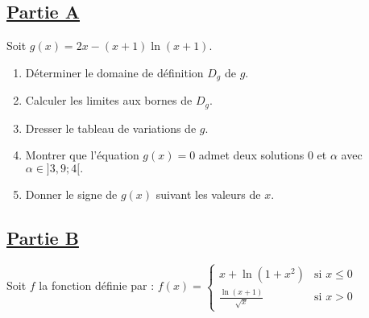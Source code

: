 \documentclass[12pt,a4paper]{article}
\begin{document}
    \section*{}

    \subsection*{\underline{\textbf{Partie A}}}

    Soit  \( g(x) = 2x - (x+1) \ln(x+1). \)

    \begin{enumerate}
        \item Déterminer le domaine de définition \( D_g \) de \( g \).
        \item Calculer les limites aux bornes de \( D_g \).
        \item Dresser le tableau de variations de \( g \).
        \item Montrer que l’équation \( g(x) = 0 \) admet deux solutions \( 0 \) et \( \alpha \) avec
              \(     \alpha \in ]3,9; 4[. \)
        \item Donner le signe de \( g(x) \) suivant les valeurs de \( x \).
    \end{enumerate}

    \subsection*{\underline{\textbf{Partie B}}}

    Soit \( f \) la fonction définie par :
    \( f(x) =
    \begin{cases}
        x + \ln(1 + x^2)          & \text{si } x \leq 0 \\
        \frac{\ln(x+1)}{\sqrt{x}} & \text{si } x > 0
    \end{cases} \)
\end{document}
